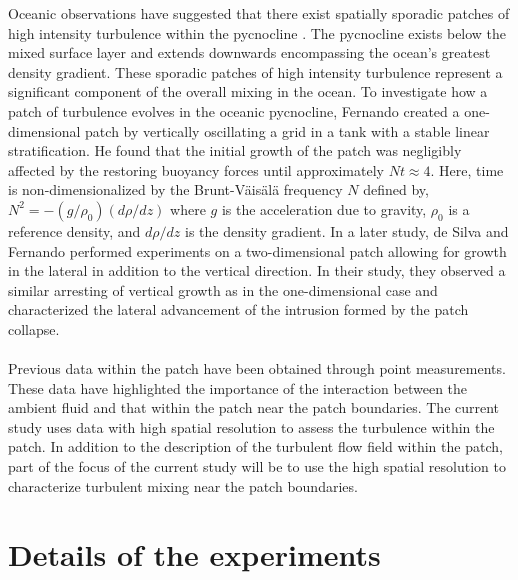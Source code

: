 \documentclass[10pt,a4paper]{article}
\begin{document}
Oceanic observations have suggested that there exist spatially sporadic patches of high intensity turbulence within the pycnocline \cite{Nasmyth1970}.  The pycnocline exists below the mixed surface layer and extends downwards encompassing the ocean's greatest density gradient.  These sporadic patches of high intensity turbulence represent a significant component of the overall mixing in the ocean.  To investigate how a patch of turbulence evolves in the oceanic pycnocline, Fernando \cite{Fernando1988} created a one-dimensional patch by vertically oscillating a grid in a tank with a stable linear stratification.  He found that the initial growth of the patch was negligibly affected by the restoring buoyancy forces until approximately $Nt\approx 4$.  Here, time is non-dimensionalized by the Brunt-V\"ais\"al\"a frequency $N$ defined by, $N^2=-(g/\rho_0)(d\rho/dz)$ where $g$ is the acceleration due to gravity, $\rho_0$ is a reference density, and $d\rho/dz$ is the density gradient.  In a later study, de Silva and Fernando \cite{Silva1998} performed experiments on a two-dimensional patch allowing for growth in the lateral in addition to the vertical direction.  In their study, they observed a similar arresting of vertical growth as in the one-dimensional case and characterized the lateral advancement of the intrusion formed by the patch collapse.
\\
\\
Previous data within the patch have been obtained through point measurements.  These data have highlighted the importance of the interaction between the ambient fluid and that within the patch \cite{Silva1998} near the patch boundaries.  The current study uses data with high spatial resolution to assess the turbulence within the patch.  In addition to the description of the turbulent flow field within the patch, part of the focus of the current study will be to use the high spatial resolution to characterize turbulent mixing near the patch boundaries.  

\section{Details of the experiments}
\end{document}

